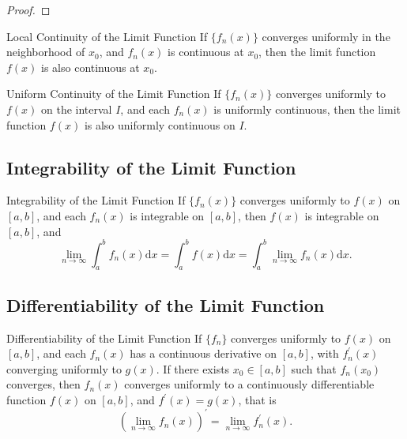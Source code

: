 \begin{proof}
  
\end{proof}

\begin{theorem}{Local Continuity of the Limit Function}{}
  If $\{f_n(x)\}$ converges uniformly in the neighborhood of $x_0$,
  and $f_n(x)$ is continuous at $x_0$, then the limit function $f(x)$
  is also continuous at $x_0$.
\end{theorem}

\begin{theorem}{Uniform Continuity of the Limit Function}{}
  If $\{f_n(x)\}$ converges uniformly to $f(x)$ on the interval $I$,
  and each $f_n(x)$ is uniformly continuous,
  then the limit function $f(x)$ is also uniformly continuous on $I$.
\end{theorem}

\subsection{Integrability of the Limit Function}

\begin{theorem}{Integrability of the Limit Function}{}
  If $\{f_n(x)\}$ converges uniformly to $f(x)$ on $[a, b]$,
  and each $f_n(x)$ is integrable on $[a, b]$,
  then $f(x)$ is integrable on $[a, b]$, and
  \begin{equation}
    \lim \limits _{n \rightarrow \infty} \int_a^b f_n(x) \mathrm{d} x 
    = \int_a^b f(x)\mathrm{d} x = \int_a^b \lim \limits _{n \rightarrow \infty} f_n(x) \mathrm{d} x.
  \end{equation}
\end{theorem}



\subsection{Differentiability of the Limit Function}

\begin{theorem}{Differentiability of the Limit Function}{}
  If $\{f_n\}$ converges uniformly to $f(x)$ on $[a, b]$,
  and each $f_n(x)$ has a continuous derivative on $[a, b]$,
  with $f_n^{\prime}(x)$ converging uniformly to $g(x)$.
  If there exists $x_0 \in [a, b]$ such that $f_n(x_0)$ converges,
  then $f_n(x)$ converges uniformly to a continuously differentiable function $f(x)$
  on $[a, b]$, and $f^{\prime}(x) = g(x)$, that is
  \begin{equation}
    (\lim \limits _{n \rightarrow \infty} f_n(x))^{\prime}
    = \lim \limits _{n \rightarrow \infty} f_n^{\prime}(x).
  \end{equation}
\end{theorem}



